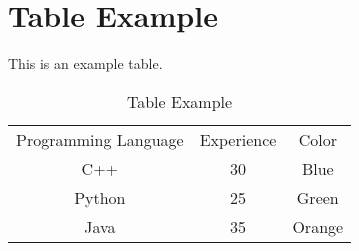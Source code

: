 \documentclass{article}
\begin{document}
\section{Table Example}
This is an example table.
\begin{table}[h]
\centering
\begin{tabular}{|c|c|c|}
\hline
Programming Language & Experience & Color \\
C++ & 30 & Blue \\
Python & 25 & Green \\
Java & 35 & Orange \\
\hline
\end{tabular}\caption{Table Example}
\end{table}
\end{document}
